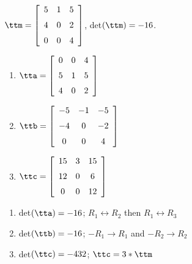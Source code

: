 {$\ttm=\left[ \begin {array}{ccc} 5&1&5\\\noalign{\medskip}4&0&2
\\\noalign{\medskip}0&0&4\end {array} \right] $,
 \quad
 det$(\ttm)=-16$.
\begin{enumerate}
\item $\tta = \left[ \begin {array}{ccc} 0&0&4\\\noalign{\medskip}5&1&5
\\\noalign{\medskip}4&0&2\end {array} \right] $
\item	$\ttb = \left[ \begin {array}{ccc} -5&-1&-5\\\noalign{\medskip}-4&0&-2
\\\noalign{\medskip}0&0&4\end {array} \right]$
\item	$\ttc = \left[ \begin {array}{ccc} 15&3&15\\\noalign{\medskip}12&0&6
\\\noalign{\medskip}0&0&12\end {array} \right]$
\end{enumerate}} 
{\begin{enumerate}
\item det$(\tta) = -16$; $R_1\leftrightarrow R_2$ then $R_1\leftrightarrow R_3$
\item det$(\ttb) = -16$; $-R_1\rightarrow R_1$ and $-R_2\rightarrow R_2$
\item det$(\ttc) = -432$; $\ttc = 3*\ttm$
\end{enumerate}}



  

